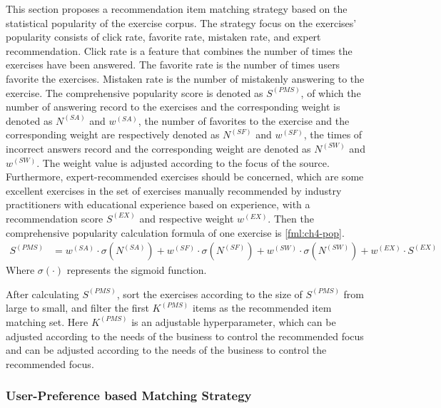 This section proposes a recommendation item matching strategy based on the statistical popularity of the exercise corpus. The strategy focus on the exercises' popularity consists of click rate, favorite rate, mistaken rate, and expert recommendation. Click rate is a feature that combines the number of times the exercises have been answered. The favorite rate is the number of times users favorite the exercises. Mistaken rate is the number of mistakenly answering to the exercise. The comprehensive popularity score is denoted as \(S^{(PMS)}\), of which the number of answering record to the exercises and the corresponding weight is denoted as \(N^{(SA)}\) and \(w^{(SA)}\), the number of favorites to the exercise and the corresponding weight are respectively denoted as \(N^{(SF)}\) and \(w^{(SF)} \), the times of incorrect answers record and the corresponding weight are denoted as \(N^{(SW)}\) and \(w^{(SW)}\). The weight value is adjusted according to the focus of the source. Furthermore, expert-recommended exercises should be concerned, which are some excellent exercises in the set of exercises manually recommended by industry practitioners with educational experience based on experience, with a recommendation score \(S^{(EX)}\) and respective weight \(w^{(EX)}\). Then the comprehensive popularity calculation formula of one exercise is \ref{fml:ch4-pop}.
\begin{align}
  S^{(PMS)} & = w^{(SA)}\cdot \sigma(N^{(SA)})+w^{(SF)}\cdot\sigma(N^{(SF)})+w^{(SW)}\cdot\sigma(N^{(SW)})+w^{(EX)}\cdot S^{(EX)}\label{fml:ch4-pop}
\end{align}
Where \(\sigma(\cdot)\) represents the sigmoid function.

After calculating \(S^{(PMS)}\), sort the exercises according to the size of \(S^{(PMS)}\) from large to small, and filter the first \(K^{(PMS)}\) items as the recommended item matching set. Here \(K^{(PMS)}\) is an adjustable hyperparameter, which can be adjusted according to the needs of the business to control the recommended focus and can be adjusted according to the needs of the business to control the recommended focus.

\subsubsection{User-Preference based Matching Strategy}

